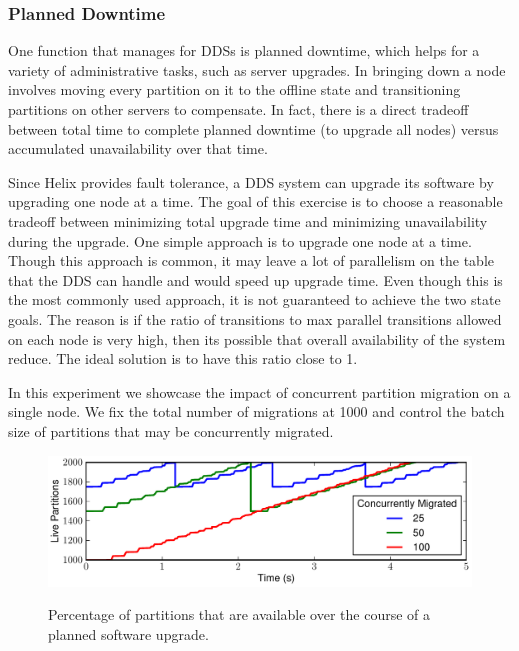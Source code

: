 \subsubsection{Planned Downtime}
\label{sec:downtime}
%
One function that \helix manages for DDSs is planned downtime, which helps for a
variety of administrative tasks, such as server upgrades.  In \ES bringing down
a node involves moving every partition on it to the offline state and
transitioning partitions on other servers to compensate. In fact, there
is a direct tradeoff between total time to complete planned downtime (\eg to
upgrade all nodes) versus accumulated unavailability over that time. 

Since Helix provides fault tolerance, a DDS system can upgrade its software by upgrading one node at a time. 
The goal of this exercise is to choose a reasonable tradeoff between minimizing
total upgrade time and minimizing unavailability during the upgrade. 
One simple approach is to upgrade one node at a time. 
Though this approach is common, it may leave a lot of parallelism on the table
that the DDS can handle and would speed up upgrade time.
Even though this is the most commonly used approach,
it is not guaranteed to achieve the two state goals.
The reason is if the ratio of transitions to max parallel transitions allowed on each node is very high, 
then its possible that overall availability of the system reduce.
The ideal solution is to have this ratio  close to 1. 

In this experiment we showcase the impact of concurrent partition migration on a
single node. We fix the total number of migrations at 1000 and control the
batch size of partitions that may be concurrently migrated. 

\begin{figure}[t]
    {\includegraphics[width=\columnwidth]{migration-timeseries.pdf}}
    \vspace*{-2ex}
    \caption{\label{fig:migration_timeseries} Percentage of partitions that are
available over the course of a planned software upgrade.}
\end{figure}

